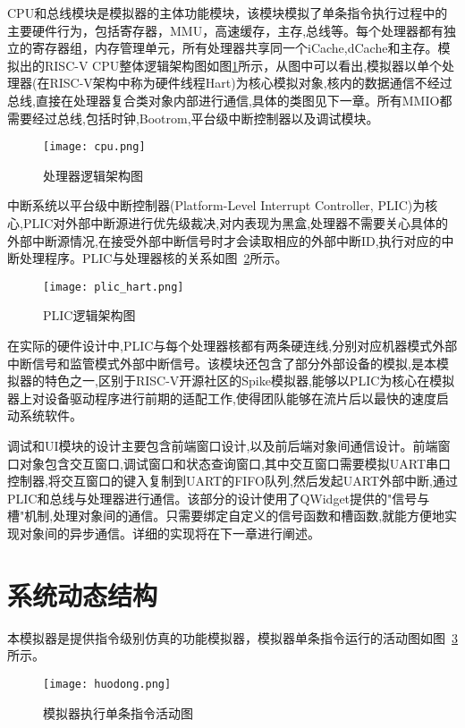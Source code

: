 CPU和总线模块是模拟器的主体功能模块，该模块模拟了单条指令执行过程中的主要硬件行为，包括寄存器，MMU，高速缓存，主存,总线等。每个处理器都有独立的寄存器组，内存管理单元，所有处理器共享同一个iCache,dCache和主存。模拟出的RISC-V CPU整体逻辑架构图如图\ref{fig:cpu}所示，从图中可以看出,模拟器以单个处理器(在RISC-V架构中称为硬件线程Hart)为核心模拟对象,核内的数据通信不经过总线,直接在处理器复合类对象内部进行通信,具体的类图见下一章。所有MMIO都需要经过总线,包括时钟,Bootrom,平台级中断控制器以及调试模块。
\begin{figure}[H]
  \centering
  \texttt{[image: cpu.png]}
  \caption{处理器逻辑架构图}
  \label{fig:cpu}
\end{figure}


中断系统以平台级中断控制器(Platform-Level Interrupt Controller, PLIC)为核心,PLIC对外部中断源进行优先级裁决,对内表现为黑盒,处理器不需要关心具体的外部中断源情况,在接受外部中断信号时才会读取相应的外部中断ID,执行对应的中断处理程序。PLIC与处理器核的关系如图~\ref{fig:plic-to-hart}所示。
\begin{figure}[H]
  \centering
  \texttt{[image: plic\_hart.png]}
  \caption{PLIC逻辑架构图}
  \label{fig:plic-to-hart}
\end{figure}
在实际的硬件设计中,PLIC与每个处理器核都有两条硬连线,分别对应机器模式外部中断信号和监管模式外部中断信号。该模块还包含了部分外部设备的模拟,是本模拟器的特色之一,区别于RISC-V开源社区的Spike模拟器,能够以PLIC为核心在模拟器上对设备驱动程序进行前期的适配工作,使得团队能够在流片后以最快的速度启动系统软件。


调试和UI模块的设计主要包含前端窗口设计,以及前后端对象间通信设计。前端窗口对象包含交互窗口,调试窗口和状态查询窗口,其中交互窗口需要模拟UART串口控制器,将交互窗口的键入复制到UART的FIFO队列,然后发起UART外部中断,通过PLIC和总线与处理器进行通信。该部分的设计使用了QWidget提供的"信号与槽"机制,处理对象间的通信。只需要绑定自定义的信号函数和槽函数,就能方便地实现对象间的异步通信。详细的实现将在下一章进行阐述。

\section{系统动态结构}
本模拟器是提供指令级别仿真的功能模拟器，模拟器单条指令运行的活动图如图~\ref{fig:sim-seq1}所示。
\begin{figure}[H]
  \centering
  \texttt{[image: huodong.png]}
  \caption{模拟器执行单条指令活动图}
  \label{fig:sim-seq1}
\end{figure}



